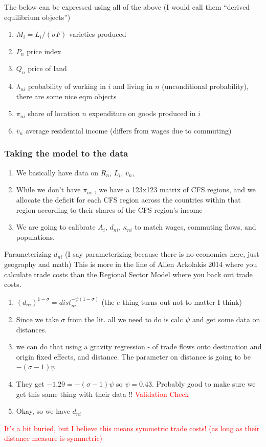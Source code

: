 \documentclass{article}
\begin{document}
The below can be expressed using all of the above (I would call them ``derived equilibrium objects'')
\begin{enumerate}
\item $M_i = L_i/(\sigma F)$ varieties produced
\item $P_n$ price index
\item $Q_n$ price of land
\item $\lambda_{ni}$ probability of working in $i$ and living in $n$ (unconditional probability), there are some nice eqm objects
\item $\pi_{ni}$ share of location $n$ expenditure on goods produced in $i$
\item $\bar v_n$ average residential income (differs from wages due to commuting)
\end{enumerate}

\subsubsection{Taking the model to the data}


\begin{enumerate}
    \item We basically have data on $R_n$, $L_i$, $\bar v_n$, 
    \item While we don't have $\pi_{ni}$ , we have a 123x123 matrix of CFS regions, and we allocate the deficit for each CFS region across the countries within that region according to their shares of the CFS region's income
\item  We are going to calibrate $A_i$, $d_{ni}$, $\kappa_{ni}$ to match wages, commuting flows, and populations.
\end{enumerate}

Parameterizing $d_{ni}$ (I say parameterizing because there is no economics here, just geography and math)
This is more in the line of Allen Arkolakis 2014 where you calculate trade costs than the Regional Sector Model where you back out trade costs.

\begin{enumerate}
\item $(d_{ni})^{1-\sigma} = dist_{ni}^{-\psi (1-\sigma)} $ (the $\tilde e$ thing turns out not to matter I think)
\item Since we take $\sigma$ from the lit. all we need to do is calc $\psi$ and get some data on distances.
\item we can do that using a gravity regression - of trade flows onto destination and origin fixed effects, and distance. The parameter on distance is going to be 
$-(\sigma-1)\psi$
\item They get $-1.29 = -(\sigma-1)\psi$ so $\psi = 0.43$. Probably good to make sure we get this same thing with their data !! \textcolor{red}{Validation Check}
\item Okay, so we have $d_{ni}$
\end{enumerate}
\textcolor{red}{It's a bit buried, but I believe this means symmetric trade costs! (as long as their distance measure is symmetric)}
\end{document}
